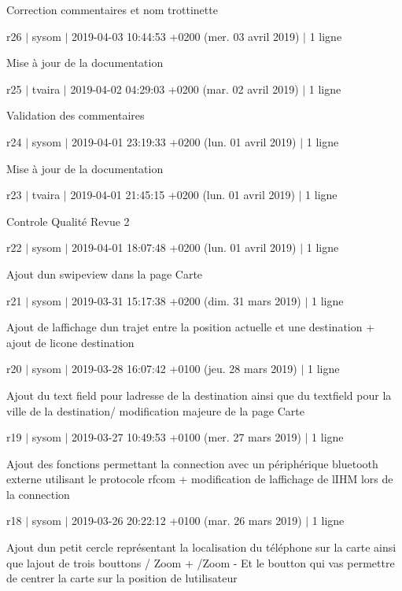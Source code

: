 Correction commentaires et nom trottinette

r26 $\vert$ sysom $\vert$ 2019-\/04-\/03 10\+:44\+:53 +0200 (mer. 03 avril 2019) $\vert$ 1 ligne

Mise à jour de la documentation

r25 $\vert$ tvaira $\vert$ 2019-\/04-\/02 04\+:29\+:03 +0200 (mar. 02 avril 2019) $\vert$ 1 ligne

Validation des commentaires

r24 $\vert$ sysom $\vert$ 2019-\/04-\/01 23\+:19\+:33 +0200 (lun. 01 avril 2019) $\vert$ 1 ligne

Mise à jour de la documentation

r23 $\vert$ tvaira $\vert$ 2019-\/04-\/01 21\+:45\+:15 +0200 (lun. 01 avril 2019) $\vert$ 1 ligne

Controle Qualité Revue 2

r22 $\vert$ sysom $\vert$ 2019-\/04-\/01 18\+:07\+:48 +0200 (lun. 01 avril 2019) $\vert$ 1 ligne

Ajout d\textquotesingle{}un swipeview dans la page Carte

r21 $\vert$ sysom $\vert$ 2019-\/03-\/31 15\+:17\+:38 +0200 (dim. 31 mars 2019) $\vert$ 1 ligne

Ajout de l\textquotesingle{}affichage d\textquotesingle{}un trajet entre la position actuelle et une destination + ajout de l\textquotesingle{}icone destination

r20 $\vert$ sysom $\vert$ 2019-\/03-\/28 16\+:07\+:42 +0100 (jeu. 28 mars 2019) $\vert$ 1 ligne

Ajout du text field pour l\textquotesingle{}adresse de la destination ainsi que du textfield pour la ville de la destination/ modification majeure de la page Carte

r19 $\vert$ sysom $\vert$ 2019-\/03-\/27 10\+:49\+:53 +0100 (mer. 27 mars 2019) $\vert$ 1 ligne

Ajout des fonctions permettant la connection avec un périphérique bluetooth externe utilisant le protocole rfcom + modification de l\textquotesingle{}affichage de l\textquotesingle{}I\+HM lors de la connection

r18 $\vert$ sysom $\vert$ 2019-\/03-\/26 20\+:22\+:12 +0100 (mar. 26 mars 2019) $\vert$ 1 ligne

Ajout d\textquotesingle{}un petit cercle représentant la localisation du téléphone sur la carte ainsi que l\textquotesingle{}ajout de trois bouttons / Zoom + /\+Zoom -\/ Et le boutton qui vas permettre de centrer la carte sur la position de l\textquotesingle{}utilisateur

